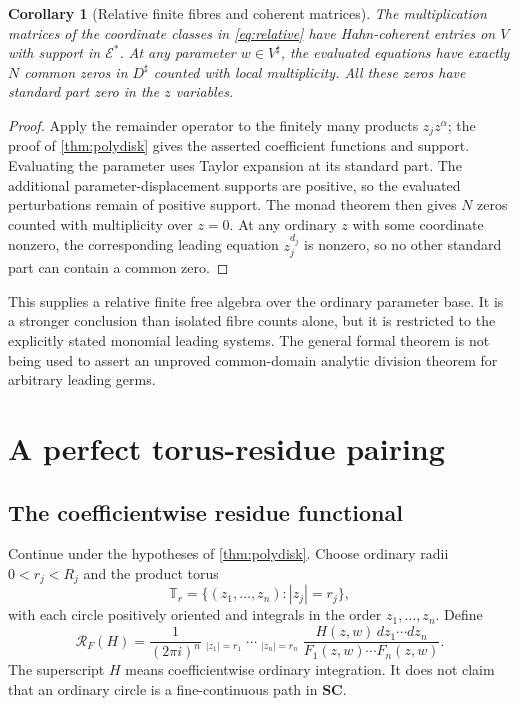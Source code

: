 \documentclass[11pt,letterpaper]{article}
\newtheorem{corollary}[corollary]{Corollary}
\theoremstyle{definition}
\theoremstyle{remark}
\newcommand{\SC}{\mathbf{SC}}
\newcommand{\EE}{\mathcal E}
\newcommand{\sh}{^{\sharp}}
\newcommand{\Hoint}{\mathop{\oint^{\!H}}\nolimits}
\numberwithin{equation}{section}
\begin{document}
\begin{corollary}[Relative finite fibres and coherent matrices]\label{cor:relativefibres}
The multiplication matrices of the coordinate classes in \eqref{eq:relative} have Hahn-coherent entries on $V$ with support in $\EE^*$. At any parameter $w\in V\sh$, the evaluated equations have exactly $N$ common zeros in $D\sh$ counted with local multiplicity. All these zeros have standard part zero in the $z$ variables.
\end{corollary}
\begin{proof}
Apply the remainder operator to the finitely many products $z_jz^\alpha$; the proof of \cref{thm:polydisk} gives the asserted coefficient functions and support. Evaluating the parameter uses Taylor expansion at its standard part. The additional parameter-displacement supports are positive, so the evaluated perturbations remain of positive support. The monad theorem then gives $N$ zeros counted with multiplicity over $z=0$. At any ordinary $z$ with some coordinate nonzero, the corresponding leading equation $z_j^{d_j}$ is nonzero, so no other standard part can contain a common zero.
\end{proof}
This supplies a relative finite free algebra over the ordinary parameter base. It is a stronger conclusion than isolated fibre counts alone, but it is restricted to the explicitly stated monomial leading systems. The general formal theorem is not being used to assert an unproved common-domain analytic division theorem for arbitrary leading germs.

\section{A perfect torus-residue pairing}\label{sec:residue}
\subsection{The coefficientwise residue functional}
Continue under the hypotheses of \cref{thm:polydisk}. Choose ordinary radii $0<r_j<R_j$ and the product torus
\[
 \mathbb T_r=\{(z_1,\ldots,z_n):|z_j|=r_j\},
\]
with each circle positively oriented and integrals in the order $z_1,\ldots,z_n$. Define
\begin{equation}\label{eq:torusres}
 \mathcal R_F(H)=\frac{1}{(2\pi i)^n}
 \Hoint_{|z_1|=r_1}\cdots\Hoint_{|z_n|=r_n}
 \frac{H(z,w)\,dz_1\cdots dz_n}{F_1(z,w)\cdots F_n(z,w)}.
\end{equation}
The superscript $H$ means coefficientwise ordinary integration. It does not claim that an ordinary circle is a fine-continuous path in $\SC$.
\end{document}
